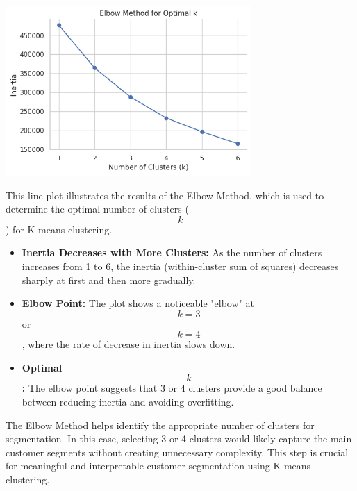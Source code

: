 \documentclass[a4paper]{article}
\begin{document}
\begin{multicols}{2}
\noindent
\begin{minipage}{\columnwidth}
\centering
\includegraphics[width=0.7\textwidth]{Elbow Method for Optimal k.png}
\label{fig:elbow_method}
\end{minipage}

This line plot illustrates the results of the Elbow Method, which is used to determine the optimal number of clusters ($$k$$) for K-means clustering.

\begin{itemize}
    \item \textbf{Inertia Decreases with More Clusters:} As the number of clusters increases from 1 to 6, the inertia (within-cluster sum of squares) decreases sharply at first and then more gradually.
    \item \textbf{Elbow Point:} The plot shows a noticeable "elbow" at $$k = 3$$ or $$k = 4$$, where the rate of decrease in inertia slows down.
    \item \textbf{Optimal $$k$$:} The elbow point suggests that 3 or 4 clusters provide a good balance between reducing inertia and avoiding overfitting.
\end{itemize}

The Elbow Method helps identify the appropriate number of clusters for segmentation. In this case, selecting 3 or 4 clusters would likely capture the main customer segments without creating unnecessary complexity. This step is crucial for meaningful and interpretable customer segmentation using K-means clustering.





\end{multicols}
\end{document}
